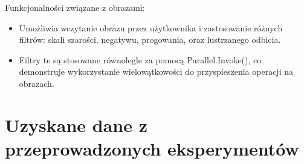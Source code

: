\documentclass{report}
\begin{document}
Funkcjonalności związane z obrazami:
\begin{itemize}
	\item Umożliwia wczytanie obrazu przez użytkownika i zastosowanie różnych filtrów: skali szarości, negatywu, progowania, oraz lustrzanego odbicia.
	\item Filtry te są stosowane równolegle za pomocą Parallel.Invoke(), co demonstruje wykorzystanie wielowątkowości do przyspieszenia operacji na obrazach.
\end{itemize}


\vspace*{15pt}
{\let\clearpage\relax\chapter{Uzyskane dane z przeprowadzonych eksperymentów}}
\end{document}
